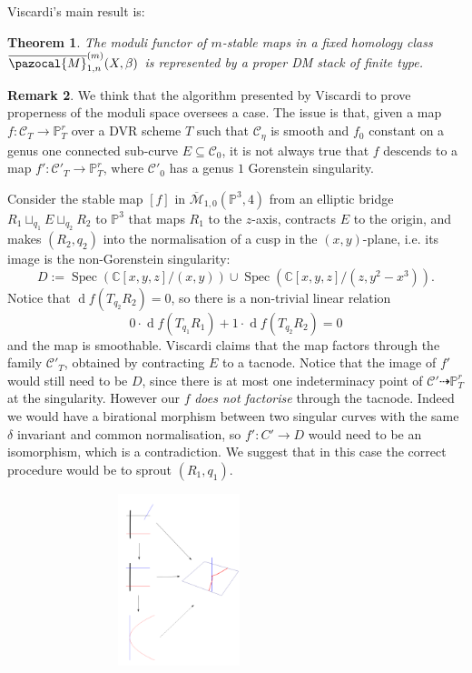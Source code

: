 \documentclass[11pt]{amsart}
\newcommand{\PP}{\mathbb P}
\renewcommand{\to}{\rightarrow}
\newcommand{\cC}{\mathcal C}
\newcommand{\Spec}{\operatorname{Spec}}
\theoremstyle{plain}
\newtheorem{thm}{Theorem}[section]
\theoremstyle{definition}
\newtheorem{remark}[thm]{Remark}
\begin{document}
 Viscardi's main result \cite[Thm. 3.6]{VISC} is:
\begin{thm}
The moduli functor of $m$-stable maps in a fixed homology class $\overline{\pazocal{M}}^{(m)}_{1,n}(X,\beta)$ is represented by a proper DM stack of finite type.
\end{thm}
\begin{remark}\label{remark:sprouting}
We think that the algorithm presented by Viscardi to prove properness of the moduli space oversees a case. The issue is that, given a map $f\colon \cC_T\to\PP^r_T$ over a DVR scheme $T$ such that $\cC_\eta$ is smooth and $f_0$ constant on a genus one connected sub-curve $E\subseteq \cC_0$, it is not always true that $f$ descends to a map $f'\colon \cC'_T\to\PP^r_T$, where $\cC'_0$ has a genus $1$ Gorenstein singularity.%

Consider the stable map $[f]$ in $\overline{\mathcal M}_{1,0}(\PP^3,4)$ from an elliptic bridge $R_1\sqcup_{q_1}E\sqcup_{q_2} R_2$ to $\PP^3$ that maps $R_1$ to the $z$-axis, contracts $E$ to the origin, and makes $(R_2,q_2)$ into the normalisation of a cusp in the $(x,y)$-plane, i.e. its image is the non-Gorenstein singularity: \[D:=\Spec\left(\mathbb C[x,y,z]/(x,y)\right)\cup \Spec\left(\mathbb C[x,y,z]/(z,y^2-x^3)\right).\] 
Notice that $\operatorname{d}\!f(T_{q_2}R_2)=0$, so there is a non-trivial linear relation
\[0\cdot\operatorname{d}\!f(T_{q_1}R_1)+1\cdot\operatorname{d}\!f(T_{q_2}R_2)=0\] and the map is smoothable. Viscardi claims that the map factors through the family $\cC'_T$, obtained by contracting $E$ to a tacnode. Notice that the image of $f'$ would still need to be $D$, since there is at most one indeterminacy point of $\cC'\dashrightarrow\PP^r_T$ at the singularity. However our $f$ \emph{does not factorise} through the tacnode. Indeed we would have a birational morphism between two singular curves with the same $\delta$ invariant and common normalisation, so $f'\colon C'\to D$ would need to be an isomorphism, which is a contradiction.
 We suggest that in this case the correct procedure would be to sprout $(R_1,q_1).$
\begin{center}
\includegraphics[width=10cm,height=5cm]{cusp_line_transv.png}
\end{center}


\end{remark}
\end{document}
